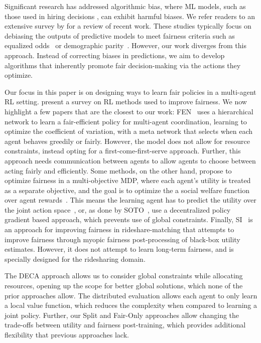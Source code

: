 Significant research has addressed algorithmic bias, where ML models, such as those used in hiring decisions \citep{raghavan2020hiringbias}, can exhibit harmful biases. 
We refer readers to an extensive survey by \citet{mehrabi2021MLBiassurvey} for a review of recent work.
These studies typically focus on debiasing the outputs of predictive models to meet fairness criteria such as equalized odds~\citep{hardt2016equality} or demographic parity~\citep{DP_dwork2012}. However, our work diverges from this approach. Instead of correcting biases in predictions, we aim to develop algorithms that inherently promote fair decision-making via the actions they optimize.

Our focus in this paper is on designing ways to learn fair policies in a multi-agent RL setting. \citet{FairRLSurvey} present a survey on RL methods used to improve fairness. We now highlight a few papers that are the closest to our work: FEN~\citep{jiang2019FEN} uses a hierarchical network to learn a fair-efficient policy for multi-agent coordination, learning to optimize the coefficient of variation, with a meta network that selects when each agent behaves greedily or fairly. However, the model does not allow for resource constraints, instead opting for a first-come-first-serve approach. Further, this approach needs communication between agents to allow agents to choose between acting fairly and efficiently. Some methods, on the other hand, propose to optimize fairness in a multi-objective MDP, where each agent's utility is treated as a separate objective, and the goal is to optimize the a social welfare function over agent rewards~\citep{zimmer2021MOMDP,siddique2020MOMDP}. 
This means the learning agent has to predict the utility over the joint action space~\citep{siddique2020MOMDP}, or, as done by SOTO~\citep{zimmer2021MOMDP}, use a decentralized policy gradient based approach, which prevents use of global constraints. 
Finally, SI~\citep{SI_kumar2023} is an approach for improving fairness in rideshare-matching that attempts to improve fairness through myopic fairness post-processing of black-box utility estimates. However, it does not attempt to learn long-term fairness, and is specially designed for the ridesharing domain.

The DECA approach allows us to consider global constraints while allocating resources, opening up the scope for better global solutions, which none of the prior approaches allow. The distributed evaluation allows each agent to only learn a local value function, which reduces the complexity when compared to learning a joint policy. Further, our Split and Fair-Only approaches allow changing the trade-offs between utility and fairness post-training, which provides additional flexibility that previous approaches lack. 


